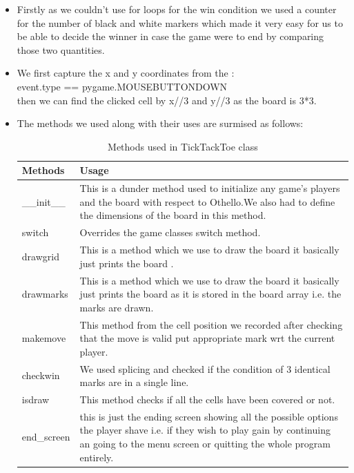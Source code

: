 \documentclass{article}
\begin{document}
\begin{itemize}[leftmargin=1.5em, topsep=0pt, itemsep=0pt]
\begin{itemize}[leftmargin=1.5em, topsep=0pt, itemsep=0pt]
\begin{itemize}[leftmargin=1.5em, topsep=0pt, itemsep=0pt]
    \item Firstly as we couldn't use for loops for the win condition we used a counter for the number of black and white markers which made it very easy for us to be able to decide the winner in case the game were to end by comparing those two quantities.\\
    
    \item We first capture the x and y coordinates from the :  \\
    event.type == pygame.MOUSEBUTTONDOWN 
    \\then we can find the clicked cell by x//3 and y//3 as the board is 3*3.\\
    \item  The methods we used along with their uses are surmised as follows:
        \begin{table}[H]
\centering
\begin{tabular}{|p{4cm}|p{9cm}|}
\hline
\textbf{Methods} & \textbf{Usage} \\ 
\hline

\_\_init\_\_
&
This is a dunder method used to initialize any game's players and the board with respect to Othello.We also had to define the dimensions of the board in this method. \\

\hline
switch 

 & Overrides the game classes switch method.\\
 \hline
drawgrid

 & This is a method which we use to draw the board it basically just prints the board .\\
\hline
drawmarks

 & This is a method which we use to draw the board it basically just prints the board as it is stored in the board array i.e. the marks are drawn.\\
\hline

makemove
 & This method from the cell position we recorded after checking that the move is valid put appropriate mark wrt the current player.\\
\hline
checkwin
 & We used splicing and checked if the condition of 3 identical marks are in a single line. \\
\hline
isdraw
 &This method checks if all the cells have been covered or not.\\
\hline
end\_screen
 & this is just the ending screen showing all the possible options the player shave i.e. if they wish to play gain by continuing an going to the menu screen or quitting the whole program entirely.\\
\hline
\end{tabular}
\caption{Methods used in TickTackToe class}
\end{table}
\newpage

\end{itemize}
\end{itemize}
\end{itemize}
\end{document}
